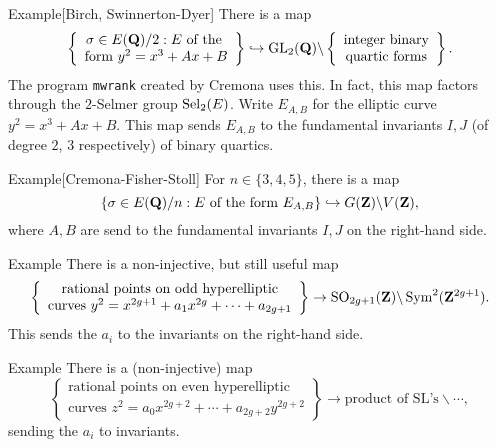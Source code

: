 \begin{enonce}[remark]{Example}[Birch, Swinnerton-Dyer] %
There is a map 
\[
  \left\{\begin{array}{c}\sigma\in E(\mathbf{Q})/2:E\text{ of the } \\ \text{form }y^2=x^3+A x+B\end{array}\right\} \hookrightarrow\operatorname{GL}_2(\mathbf{Q})\backslash \left\{\begin{array}{c}\text{integer binary} \\ \text{quartic forms}\end{array}\right\} .
\]
The program \texttt{mwrank} created by Cremona uses this. In fact, this map 
factors through the $2$-Selmer group $\operatorname{Sel}_2(E)$. Write $E_{A,B}$ for the 
elliptic curve $y^2=x^3+A x+B$. This map sends $E_{A,B}$ to the fundamental 
invariants $I,J$ (of degree $2$, $3$ respectively) of binary quartics. 
\end{enonce}

\begin{enonce}[remark]{Example}[Cremona-Fisher-Stoll]
For $n\in \{3,4,5\}$, there is a map 
\[
  \{\sigma \in E(\mathbf{Q})/n:E\text{ of the form }E_{A,B}\} \hookrightarrow G(\mathbf{Z})\backslash V(\mathbf{Z}) ,
\]
where $A,B$ are send to the fundamental invariants $I,J$ on the right-hand 
side. 
\end{enonce}

\begin{enonce}[remark]{Example} %
There is a non-injective, but still useful map 
\[
  \left\{\begin{array}{c}\text{rational points on odd hyperelliptic} \\ \text{curves }y^2=x^{2 g+1} + a_1 x^{2 g} + \cdots + a_{2g+1} \end{array} \right\} \to \operatorname{SO}_{2 g+1}(\mathbf{Z}) \backslash \operatorname{Sym}^2(\mathbf{Z}^{2 g+1}) .
\]
This sends the $a_i$ to the invariants on the right-hand side. 
\end{enonce}

\begin{enonce}[remark]{Example} %
There is a (non-injective) map 
\[
  \left\{\begin{array}{c}\text{rational points on even hyperelliptic} \\ \text{curves } z^2=a_0 x^{2 g+2} + \cdots + a_{2 g+2} y^{2 g+2} \end{array} \right\} \to \text{product of SL's} \backslash\cdots ,
\]
sending the $a_i$ to invariants. 
\end{enonce}

